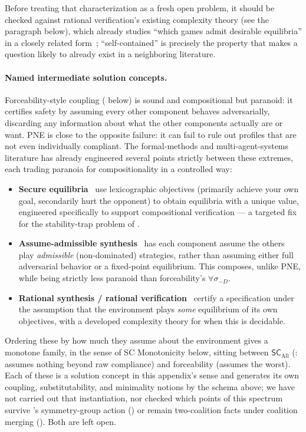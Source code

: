 Before treating that characterization as a fresh open problem, it should be
checked against rational verification's existing complexity theory (see the
paragraph below), which already studies ``which games admit desirable
equilibria'' in a closely related
form~\cite{FismanKupfermanLustig2010RationalSynthesis,AbateEtAl2021RationalVerification};
``self-contained'' is precisely the property that makes a question likely to
already exist in a neighboring literature.

\paragraph{Named intermediate solution concepts.}
Forceability-style coupling ( below) is sound and
compositional but paranoid: it certifies safety by assuming every other
component behaves adversarially, discarding any information about what the
other components actually are or want. PNE is close to the opposite failure:
it can fail to rule out profiles that are not even individually compliant.
The formal-methods and multi-agent-systems literature has already engineered
several points strictly between these extremes, each trading paranoia for
compositionality in a controlled way:
\begin{itemize}[nosep]
  \item \textbf{Secure equilibria}~\cite{ChatterjeeHenzingerJurdzinski2006SecureEquilibria}
  use lexicographic objectives (primarily achieve your own goal, secondarily
  hurt the opponent) to obtain equilibria with a unique value, engineered
  specifically to support compositional verification --- a targeted fix for
  the stability-trap problem of .
  \item \textbf{Assume-admissible synthesis}~\cite{BrenguierRaskinSankur2017AssumeAdmissible}
  has each component assume the others play \emph{admissible} (non-dominated)
  strategies, rather than assuming either full adversarial behavior or a
  fixed-point equilibrium. This composes, unlike PNE, while being strictly
  less paranoid than forceability's $\forall\sigma_{-D}$.
  \item \textbf{Rational synthesis / rational
  verification}~\cite{FismanKupfermanLustig2010RationalSynthesis,AbateEtAl2021RationalVerification}
  certify a specification under the assumption that the environment plays
  \emph{some} equilibrium of its own objectives, with a developed complexity
  theory for when this is decidable.
\end{itemize}
Ordering these by how much they assume about the environment gives a monotone
family, in the sense of SC Monotonicity below, sitting between
$\mathsf{SC}_{\mathrm{All}}$ (: assumes nothing
beyond raw compliance) and forceability (assumes the worst). Each of these is
a solution concept in this appendix's sense and generates its own coupling,
substitutability, and minimality notions by the schema above; we have not
carried out that instantiation, nor checked which points of this spectrum
survive \KFOL's symmetry-group action () or remain
two-coalition facts under coalition merging
(). Both are left open.

